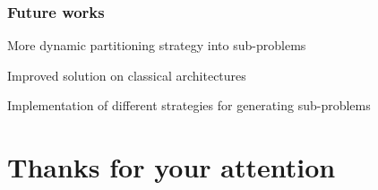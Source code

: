 \documentclass[aspectratio=169]{beamer}
\begin{document}
\begin{frame}\frametitle{Future works}

    \begin{center}
        More dynamic partitioning strategy into sub-problems 
            
        Improved solution on classical architectures
            
        Implementation of different strategies for generating sub-problems
    \end{center}

\end{frame}

\section{Thanks for your attention}
\end{document}
